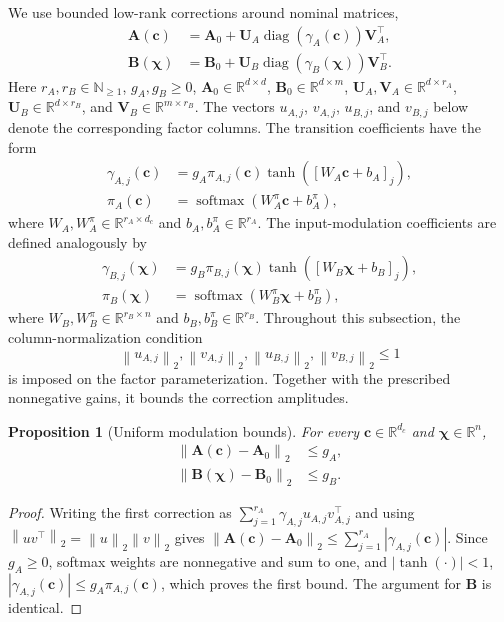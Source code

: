 \documentclass[journal]{IEEEtran}
\newtheorem{proposition}{Proposition}
\newcommand{\vc}{\mathbf{c}}
\newcommand{\vchi}{\boldsymbol{\chi}}
\newcommand{\mA}{\mathbf{A}}
\newcommand{\mB}{\mathbf{B}}
\newcommand{\mU}{\mathbf{U}}
\newcommand{\mV}{\mathbf{V}}
\newcommand{\R}{\mathbb{R}}
\newcommand{\norm}[1]{\left\lVert #1\right\rVert}
\begin{document}
We use bounded low-rank corrections around nominal matrices,
\begin{align}
    \mA(\vc)&=\mA_0+\mU_A\operatorname{diag}(\gamma_A(\vc))\mV_A^\top,
    \label{eq:transition_schedule}\\
    \mB(\vchi)&=\mB_0+\mU_B\operatorname{diag}(\gamma_B(\vchi))\mV_B^\top.
    \label{eq:low_rank_schedules}
\end{align}
Here $r_A,r_B\in\mathbb N_{\ge1}$, $g_A,g_B\ge0$, $\mA_0\in\R^{d\times d}$, $\mB_0\in\R^{d\times m}$, $\mU_A,\mV_A\in\R^{d\times r_A}$, $\mU_B\in\R^{d\times r_B}$, and $\mV_B\in\R^{m\times r_B}$. The vectors $u_{A,j}$, $v_{A,j}$, $u_{B,j}$, and $v_{B,j}$ below denote the corresponding factor columns. The transition coefficients have the form
\begin{align}
    \gamma_{A,j}(\vc)&=g_A\pi_{A,j}(\vc)\tanh([W_A\vc+b_A]_j),
    \label{eq:A_modulation_coefficients}\\
    \pi_A(\vc)&=\operatorname{softmax}(W_A^\pi\vc+b_A^\pi),
    \label{eq:A_modulation}
\end{align}
where $W_A,W_A^\pi\in\R^{r_A\times d_c}$ and $b_A,b_A^\pi\in\R^{r_A}$. The input-modulation coefficients are defined analogously by
\begin{align}
    \gamma_{B,j}(\vchi)&=g_B\pi_{B,j}(\vchi)\tanh([W_B\vchi+b_B]_j),\\
    \pi_B(\vchi)&=\operatorname{softmax}(W_B^\pi\vchi+b_B^\pi),
\end{align}
where $W_B,W_B^\pi\in\R^{r_B\times n}$ and $b_B,b_B^\pi\in\R^{r_B}$. Throughout this subsection, the column-normalization condition
\begin{equation}
 \norm{u_{A,j}}_2,\norm{v_{A,j}}_2,\norm{u_{B,j}}_2,\norm{v_{B,j}}_2\le1
 \label{eq:factor_norm_assumption}
\end{equation}
is imposed on the factor parameterization. Together with the prescribed nonnegative gains, it bounds the correction amplitudes.

\begin{proposition}[Uniform modulation bounds]
\label{prop:modulation_bound}
For every $\vc\in\R^{d_c}$ and $\vchi\in\R^n$,
\begin{equation}
    \begin{aligned}
    \norm{\mA(\vc)-\mA_0}_2&\le g_A,\\
    \norm{\mB(\vchi)-\mB_0}_2&\le g_B.
    \end{aligned}
    \label{eq:modulation_bound}
\end{equation}
\end{proposition}
\begin{proof}
Writing the first correction as $\sum_{j=1}^{r_A}\gamma_{A,j}u_{A,j}v_{A,j}^{\top}$ and using $\norm{uv^{\top}}_2=\norm u_2\norm v_2$ gives $\norm{\mA(\vc)-\mA_0}_2\le\sum_{j=1}^{r_A}|\gamma_{A,j}(\vc)|$. Since $g_A\ge0$, softmax weights are nonnegative and sum to one, and $|\tanh(\cdot)|<1$, $|\gamma_{A,j}(\vc)|\le g_A\pi_{A,j}(\vc)$, which proves the first bound. The argument for $\mB$ is identical.
\end{proof}
\end{document}
